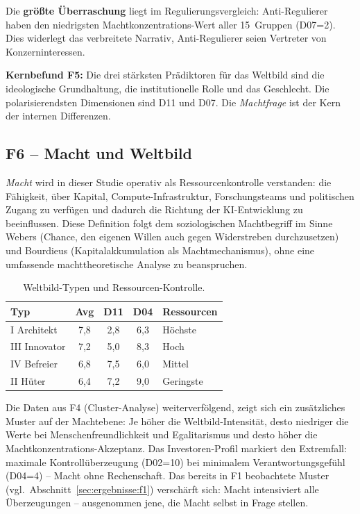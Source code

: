 \documentclass[12pt,a4paper]{article}
\begin{document}
Die \textbf{gr\"o\ss{}te \"Uberraschung} liegt im Regulierungsvergleich: Anti-Regulierer haben den niedrigsten Machtkonzentrations-Wert aller 15~Gruppen (D07=2). Dies widerlegt das verbreitete Narrativ, Anti-Regulierer seien Vertreter von Konzerninteressen.

\medskip
\noindent\textbf{Kernbefund F5:} Die drei st\"arksten Pr\"adiktoren f\"ur das Weltbild sind die ideologische Grundhaltung, die institutionelle Rolle und das Geschlecht. Die polarisierendsten Dimensionen sind D11 und D07. Die \emph{Machtfrage} ist der Kern der internen Differenzen.


\subsection{F6 -- Macht und Weltbild}
\label{sec:ergebnisse:f6}

\emph{Macht} wird in dieser Studie operativ als Ressourcenkontrolle verstanden: die F\"ahigkeit, \"uber Kapital, Compute-Infrastruktur, Forschungsteams und politischen Zugang zu verf\"ugen und dadurch die Richtung der KI-Entwicklung zu beeinflussen. Diese Definition folgt dem soziologischen Machtbegriff im Sinne Webers (\glqq Chance, den eigenen Willen auch gegen Widerstreben durchzusetzen\grqq) und Bourdieus (Kapitalakkumulation als Machtmechanismus), ohne eine umfassende machttheoretische Analyse zu beanspruchen.

\begin{table}[htbp]
  \centering
  \caption{Weltbild-Typen und Ressourcen-Kontrolle.}
  \label{tab:macht}
  \begin{tabular}{l c c c l}
    \toprule
    \textbf{Typ} & \textbf{Avg} & \textbf{D11} & \textbf{D04} & \textbf{Ressourcen} \\
    \midrule
    I Architekt  & 7,8 & 2,8 & 6,3 & H\"ochste \\
    III Innovator & 7,2 & 5,0 & 8,3 & Hoch \\
    IV Befreier  & 6,8 & 7,5 & 6,0 & Mittel \\
    II H\"uter   & 6,4 & 7,2 & 9,0 & Geringste \\
    \bottomrule
  \end{tabular}
\end{table}

Die Daten aus F4 (Cluster-Analyse) weiterverf\"olgend, zeigt sich ein zus\"atzliches Muster auf der Machtebene: Je h\"oher die Weltbild-Intensit\"at, desto niedriger die Werte bei Menschenfreundlichkeit und Egalitarismus und desto h\"oher die Machtkonzentrations-Akzeptanz. Das Investoren-Profil markiert den Extremfall: maximale Kontroll\"uberzeugung (D02=10) bei minimalem Verantwortungsgef\"uhl (D04=4) -- \glqq Macht ohne Rechenschaft\grqq. Das bereits in F1 beobachtete Muster (vgl.\ Abschnitt~\ref{sec:ergebnisse:f1}) versch\"arft sich: Macht intensiviert alle \"Uberzeugungen -- ausgenommen jene, die Macht selbst in Frage stellen.
\end{document}
